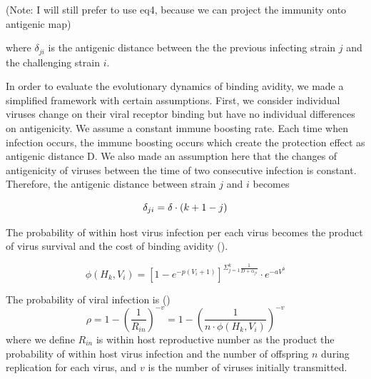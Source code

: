 \documentclass{article}
\begin{document}
(Note: I will still prefer to use eq4, because we can project the immunity onto antigenic map)

where $\delta_{ji}$ is the antigenic distance between the the previous infecting strain $j$ and the challenging strain $i$.

In order to evaluate the evolutionary dynamics of binding avidity, we made a simplified framework with certain assumptions. First, we consider individual viruses change on their viral receptor binding but have no individual differences on antigenicity. We assume a constant immune boosting rate. Each time when infection occurs, the immune boosting occurs which create the protection effect as antigenic distance D. We also made an assumption here that the changes of antigenicity of viruses between the time of two consecutive infection is constant. Therefore, the antigenic distance between strain $j$ and $i$ becomes

\begin{equation}
 \delta_{ji} = \delta\cdot (k+1-j) \\
\end{equation}

The probability of within host virus infection per each virus becomes the product of virus survival and the cost of binding avidity (\citep{Yuan2013}). 

\begin{equation}
  \phi(H_{k},V_{i}) = [1-e^{-p(V_{i}+1)}]^{\Sigma_{j=1}^{k}\frac{1}{D+\alpha_{ji}}} \cdot e^{-aV^{b}}
\end{equation} 






The probability of viral infection is (\citep{Keeling2008})
\begin{equation}
\rho=1-(\frac{1}{R_{in}})^{-v}
=1-(\frac{1}{n \cdot \phi(H_{k},V_{i})})^{-v}
\end{equation}
where we define $R_{in}$ is within host reproductive number as the product the probability of within host virus infection and the number of offspring $n$ during replication for each virus, and $v$ is the number of viruses initially transmitted.   
 
\end{document}
